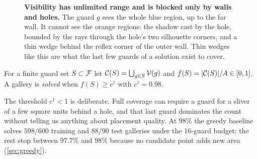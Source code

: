 \documentclass[11pt,a4paper]{article}
\begin{document}
\begin{figure}[!htbp]
\centering
{}
\caption{\textbf{Visibility has unlimited range and is blocked only by walls and holes.} The
guard $g$ sees the whole blue region, up to the far wall. It cannot see the orange regions:
the shadow cast by the hole, bounded by the rays through the hole's two silhouette corners,
and a thin wedge behind the reflex corner of the outer wall. Thin wedges like this are what
the last few guards of a solution exist to cover.}
\label{fig:visibility}
\end{figure}

\begin{definition}[Coverage]
For a finite guard set $S \subset \mathcal{F}$ let $\mathcal{C}(S) = \bigcup_{g\in S}\mathcal{V}(g)$ and
$f(S) = \lvert \mathcal{C}(S) \rvert/A \in [0,1]$. A gallery is \emph{solved} when $f(S) \ge c^\dagger$
with $c^\dagger = 0.98$.
\end{definition}

The threshold $c^\dagger < 1$ is deliberate. Full coverage can require a guard for a
sliver of a few square units behind a hole, and that last guard dominates the count
without telling us anything about placement quality. At $98\%$ the greedy baseline solves
$598/600$ training and $88/90$ test galleries under the 16-guard budget; the rest stop
between $97.7\%$ and $98\%$ because no candidate point adds new area
(\cref{sec:greedy}).
\end{document}
